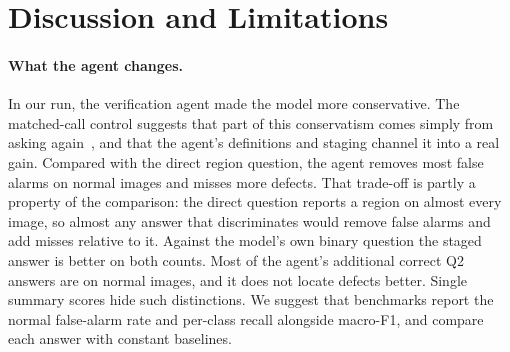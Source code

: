 \documentclass[11pt]{article}
\begin{document}
\section{Discussion and Limitations}
\paragraph{What the agent changes.} In our run, the verification agent made the model more conservative. The matched-call control suggests that part of this conservatism comes simply from asking again~\cite{huang2024cannotselfcorrect}, and that the agent's definitions and staging channel it into a real gain. Compared with the direct region question, the agent removes most false alarms on normal images and misses more defects. That trade-off is partly a property of the comparison: the direct question reports a region on almost every image, so almost any answer that discriminates would remove false alarms and add misses relative to it. Against the model's own binary question the staged answer is better on both counts. Most of the agent's additional correct Q2 answers are on normal images, and it does not locate defects better. Single summary scores hide such distinctions. We suggest that benchmarks report the normal false-alarm rate and per-class recall alongside macro-F1, and compare each answer with constant baselines.
\end{document}
